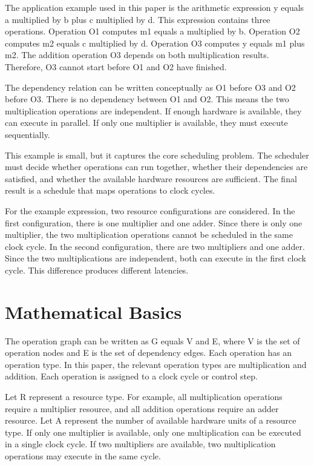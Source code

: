 \documentclass[conference]{IEEEtran}
\begin{document}
	The application example used in this paper is the arithmetic expression y equals a multiplied by b plus c multiplied by d. This expression contains three operations. Operation O1 computes m1 equals a multiplied by b. Operation O2 computes m2 equals c multiplied by d. Operation O3 computes y equals m1 plus m2. The addition operation O3 depends on both multiplication results. Therefore, O3 cannot start before O1 and O2 have finished.
	
	The dependency relation can be written conceptually as O1 before O3 and O2 before O3. There is no dependency between O1 and O2. This means the two multiplication operations are independent. If enough hardware is available, they can execute in parallel. If only one multiplier is available, they must execute sequentially.
	
	This example is small, but it captures the core scheduling problem. The scheduler must decide whether operations can run together, whether their dependencies are satisfied, and whether the available hardware resources are sufficient. The final result is a schedule that maps operations to clock cycles.
	
	For the example expression, two resource configurations are considered. In the first configuration, there is one multiplier and one adder. Since there is only one multiplier, the two multiplication operations cannot be scheduled in the same clock cycle. In the second configuration, there are two multipliers and one adder. Since the two multiplications are independent, both can execute in the first clock cycle. This difference produces different latencies.
	
	\section{Mathematical Basics}
	
	The operation graph can be written as G equals V and E, where V is the set of operation nodes and E is the set of dependency edges. Each operation has an operation type. In this paper, the relevant operation types are multiplication and addition. Each operation is assigned to a clock cycle or control step.
	
	Let R represent a resource type. For example, all multiplication operations require a multiplier resource, and all addition operations require an adder resource. Let A represent the number of available hardware units of a resource type. If only one multiplier is available, only one multiplication can be executed in a single clock cycle. If two multipliers are available, two multiplication operations may execute in the same cycle.
	
\end{document}
